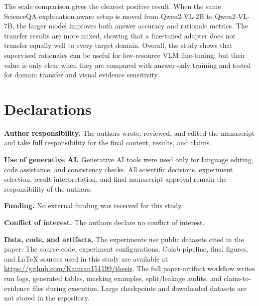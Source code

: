 \documentclass[preprint,12pt]{elsarticle}
\begin{document}
The scale comparison gives the clearest positive result.
When the same ScienceQA explanation-aware setup is moved from Qwen2-VL-2B to Qwen2-VL-7B, the larger model improves both answer accuracy and rationale metrics.
The transfer results are more mixed, showing that a fine-tuned adapter does not transfer equally well to every target domain.
Overall, the study shows that supervised rationales can be useful for low-resource VLM fine-tuning, but their value is only clear when they are compared with answer-only training and tested for domain transfer and visual evidence sensitivity.

\section*{Declarations}
\textbf{Author responsibility.}
The authors wrote, reviewed, and edited the manuscript and take full responsibility for the final content, results, and claims.

\textbf{Use of generative AI.}
Generative AI tools were used only for language editing, code assistance, and consistency checks.
All scientific decisions, experiment selection, result interpretation, and final manuscript approval remain the responsibility of the authors.

\textbf{Funding.}
No external funding was received for this study.

\textbf{Conflict of interest.}
The authors declare no conflict of interest.

\textbf{Data, code, and artifacts.}
The experiments use public datasets cited in the paper.
The source code, experiment configurations, Colab pipeline, final figures, and LaTeX sources used in this study are available at \url{https://github.com/Kamran151199/thesis}.
The full paper-artifact workflow writes run logs, generated tables, masking examples, split/leakage audits, and claim-to-evidence files during execution.
Large checkpoints and downloaded datasets are not stored in the repository.



\end{document}
